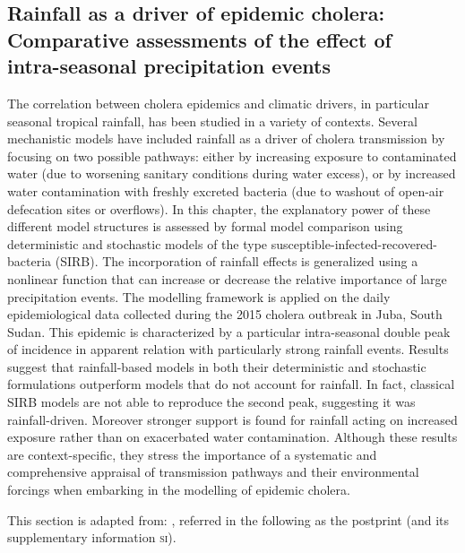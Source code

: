 \begin{fullwidth}
\chapter[Rainfall as a driver of epidemic cholera: Comparative assessments of the effect of intra-seasonal precipitation events]{Rainfall as a driver of epidemic cholera:\\Comparative assessments of the effect of\\intra-seasonal precipitation events}
\label{ch:cholera-rainfall}

The correlation between cholera epidemics and climatic drivers, in particular seasonal tropical rainfall, has been studied in a variety of contexts. Several mechanistic models have included rainfall as a driver of cholera transmission by focusing on two possible pathways: either by increasing exposure to contaminated water (\eg due to worsening sanitary conditions during water excess), or by increased water contamination with freshly excreted bacteria (\eg due to washout of open-air defecation sites or overflows). In this chapter, the explanatory power of these different model structures is assessed by formal model comparison using deterministic and stochastic models of the type susceptible-infected-recovered-bacteria (SIRB). The incorporation of rainfall effects is generalized using a nonlinear function that can increase or decrease the relative importance of large precipitation events. The modelling framework is applied on the daily epidemiological data collected during the 2015 cholera outbreak in Juba, South Sudan. This epidemic is characterized by a particular intra-seasonal double peak of incidence in apparent relation with particularly strong rainfall events. Results suggest that rainfall-based models in both their deterministic and stochastic formulations outperform models that do not account for rainfall. In fact, classical SIRB models are not able to reproduce the second peak, suggesting it was rainfall-driven. Moreover stronger support is found for rainfall acting on increased exposure rather than on exacerbated water contamination. Although these results are context-specific, they stress the importance of a systematic and comprehensive appraisal of transmission pathways and their environmental forcings when embarking in the modelling of epidemic cholera.

This section is adapted from:
, referred in the following as the postprint (and its supplementary information \textsc{si}).%
\end{fullwidth}

